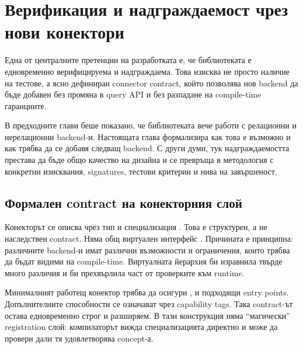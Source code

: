 \section{Верификация и надграждаемост чрез нови конектори}
\label{sec:verification_extensibility}

Една от централните претенции на разработката е, че библиотеката е едновременно верифицируема и надграждаема. Това изисква не просто наличие на тестове, а ясно дефиниран connector contract, който позволява нов backend да бъде добавен без промяна в query API и без разпадане на compile-time гаранциите.

В предходните глави беше показано, че библиотеката вече работи с релационни и нерелационни backend-и. Настоящата глава формализира как това е възможно и как трябва да се добавя следващ backend. С други думи, тук надграждаемостта престава да бъде общо качество на дизайна и се превръща в методология с конкретни изисквания, signatures, тестови критерии и нива на завършеност.

\subsection{Формален contract на конекторния слой}

Конекторът се описва чрез тип  и специализация . Това е структурен, а не наследствен contract. Няма общ виртуален интерфейс . Причината е принципна: различните backend-и имат различни възможности и ограничения, които трябва да бъдат видими на compile-time. Виртуалната йерархия би изравнила твърде много различия и би прехвърлила част от проверките към runtime.

Минималният работещ конектор трябва да осигури ,  и подходящи  entry points. Допълнителните способности се означават чрез capability tags. Така contract-ът остава едновременно строг и разширяем. В тази конструкция няма ``магически'' registration слой: компилаторът вижда специализацията директно и може да провери дали тя удовлетворява  concept-а.

